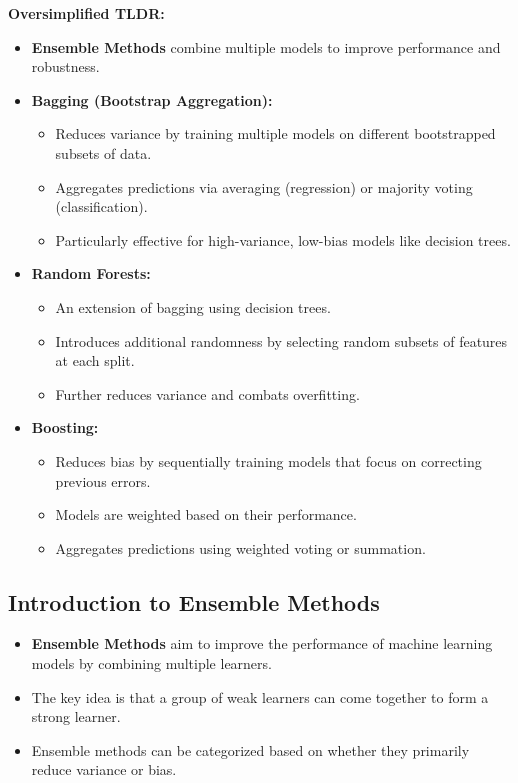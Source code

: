 \documentclass{article}
\begin{document}
\textbf{Oversimplified TLDR:}
\begin{itemize}
    \item \textbf{Ensemble Methods} combine multiple models to improve performance and robustness.
    \item \textbf{Bagging (Bootstrap Aggregation):}
    \begin{itemize}
        \item Reduces variance by training multiple models on different bootstrapped subsets of data.
        \item Aggregates predictions via averaging (regression) or majority voting (classification).
        \item Particularly effective for high-variance, low-bias models like decision trees.
    \end{itemize}
    \item \textbf{Random Forests:}
    \begin{itemize}
        \item An extension of bagging using decision trees.
        \item Introduces additional randomness by selecting random subsets of features at each split.
        \item Further reduces variance and combats overfitting.
    \end{itemize}
    \item \textbf{Boosting:}
    \begin{itemize}
        \item Reduces bias by sequentially training models that focus on correcting previous errors.
        \item Models are weighted based on their performance.
        \item Aggregates predictions using weighted voting or summation.
    \end{itemize}
\end{itemize}

\subsection{Introduction to Ensemble Methods}

\begin{itemize}
    \item \textbf{Ensemble Methods} aim to improve the performance of machine learning models by combining multiple learners.
    \item The key idea is that a group of weak learners can come together to form a strong learner.
    \item Ensemble methods can be categorized based on whether they primarily reduce variance or bias.
\end{itemize}
\end{document}
